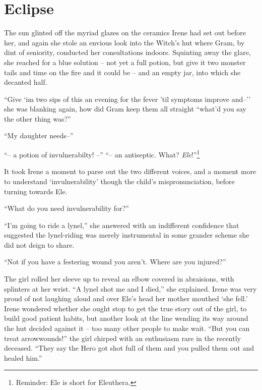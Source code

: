 \documentclass[../FGP.tex]{subfiles}
\begin{document}
\section{Eclipse}
\begin{fragment}
\end{fragment}
\begin{fragment}
The sun glinted off the myriad glazes on the ceramics Irene had set out before her, and again she stole an envious look into the Witch's hut where Gram, by dint of seniority, conducted her consultations indoors. Squinting away the glare, she reached for a blue solution -- not yet a full potion, but give it two monster tails and time on the fire and it could be -- and an empty jar, into which she decanted half. 

``Give `im two sips of this an evening for the fever 'til symptoms improve and--'' she was blanking again, how did Gram keep them all straight ``what'd you say the other thing was?''

``My daughter needs--''

``-- a potion of invulnerabilty! --''\quad
``-- an antiseptic. What? \emph{Ele}!''\footnote{Reminder: Ele is short for Eleuthera.}

It took Irene a moment to parse out the two different voices, and a moment more to understand `invulnerability' though the child's mispronunciation, before turning towards Ele. 

``What do you need invulnerability for?''

``I'm going to ride a lynel,'' she answered with an indifferent confidence that suggested the lynel-riding was merely instrumental in some grander scheme she did not deign to share.

``Not if you have a festering wound you aren't. Where are you injured?''

The girl rolled her sleeve up to reveal an elbow covered in abraisions, with splinters at her wrist. ``A lynel shot me and I died,'' she explained. Irene was very proud of not laughing aloud and over Ele's head her mother mouthed `she fell.' Irene wondered whether she ought stop to get the true story out of the girl, to build good patient habits, but another look at the line wending its way around the hut decided against it -- too many other people to make wait. ``But you can treat arrowwounds!'' the girl chirped with an enthusiasm rare in the recently deceased. ``They say the Hero got shot full of them and you pulled them out and healed him.'' 


\end{fragment}
\end{document}
